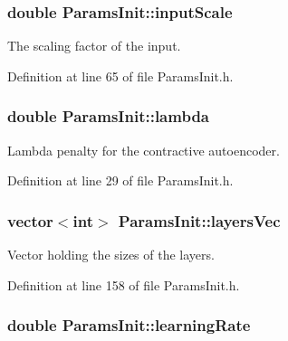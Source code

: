 \subsubsection[{\texorpdfstring{input\+Scale}{inputScale}}]{\setlength{\rightskip}{0pt plus 5cm}double Params\+Init\+::input\+Scale}\hypertarget{classParamsInit_a39a3a45f1d0f32ddf55a302ae1c767ba}{}\label{classParamsInit_a39a3a45f1d0f32ddf55a302ae1c767ba}


The scaling factor of the input. 



Definition at line 65 of file Params\+Init.\+h.

\subsubsection[{\texorpdfstring{lambda}{lambda}}]{\setlength{\rightskip}{0pt plus 5cm}double Params\+Init\+::lambda}\hypertarget{classParamsInit_a7f0aab2366101f688a811824b60c1cc9}{}\label{classParamsInit_a7f0aab2366101f688a811824b60c1cc9}


Lambda penalty for the contractive autoencoder. 



Definition at line 29 of file Params\+Init.\+h.

\subsubsection[{\texorpdfstring{layers\+Vec}{layersVec}}]{\setlength{\rightskip}{0pt plus 5cm}vector$<$int$>$ Params\+Init\+::layers\+Vec}\hypertarget{classParamsInit_aeee8365494660fa642a057d5497d46e1}{}\label{classParamsInit_aeee8365494660fa642a057d5497d46e1}


Vector holding the sizes of the layers. 



Definition at line 158 of file Params\+Init.\+h.

\subsubsection[{\texorpdfstring{learning\+Rate}{learningRate}}]{\setlength{\rightskip}{0pt plus 5cm}double Params\+Init\+::learning\+Rate}\hypertarget{classParamsInit_a357170aa7b277285467a6a5c8e073a9c}{}\label{classParamsInit_a357170aa7b277285467a6a5c8e073a9c}


